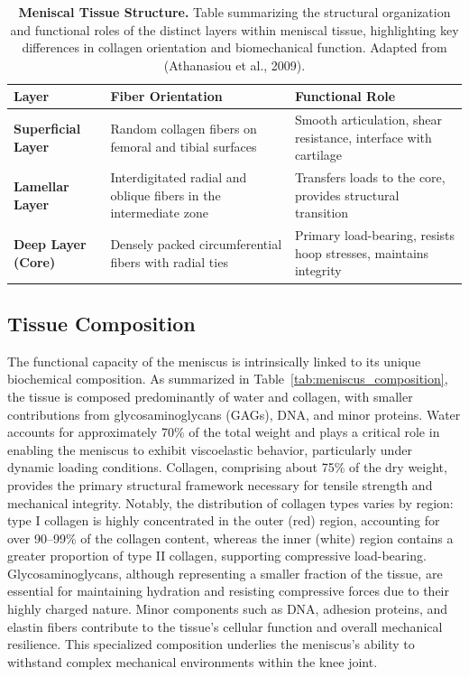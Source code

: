 \begin{table}[H]
    \centering
    \renewcommand{\arraystretch}{1.}
    \setlength{\tabcolsep}{8pt}
    \begin{tabular}{|l|p{5cm}|p{5cm}|}
        \hline
        \rowcolor{blue!20}
        \textbf{Layer} & \textbf{Fiber Orientation}& \textbf{Functional Role} \\ \hline
        \textbf{Superficial Layer} & Random collagen fibers on femoral and tibial surfaces & Smooth articulation, shear resistance, interface with cartilage \\ \hline
        \textbf{Lamellar Layer} & Interdigitated radial and oblique fibers in the intermediate zone & Transfers loads to the core, provides structural transition \\ \hline
        \textbf{Deep Layer (Core)} & Densely packed circumferential fibers with radial ties & Primary load-bearing, resists hoop stresses, maintains integrity \\ \hline
    \end{tabular}
    \caption{\textbf{Meniscal Tissue Structure.} Table summarizing the structural organization and functional roles of the distinct layers within meniscal tissue, highlighting key differences in collagen orientation and biomechanical function. Adapted from (Athanasiou et al., 2009).}
    \label{tab:meniscal_structure}
\end{table}

\subsection{Tissue Composition}

The functional capacity of the meniscus is intrinsically linked to its unique biochemical composition. As summarized in Table~\ref{tab:meniscus_composition}, the tissue is composed predominantly of water and collagen, with smaller contributions from glycosaminoglycans (GAGs), DNA, and minor proteins. Water accounts for approximately 70\% of the total weight and plays a critical role in enabling the meniscus to exhibit viscoelastic behavior, particularly under dynamic loading conditions\cite{makris2011kneemeniscus,gupta2020meniscaltissue,moutos2007biomimeticthreedimensional}. Collagen, comprising about 75\% of the dry weight, provides the primary structural framework necessary for tensile strength and mechanical integrity. Notably, the distribution of collagen types varies by region: type I collagen is highly concentrated in the outer (red) region, accounting for over 90--99\% of the collagen content, whereas the inner (white) region contains a greater proportion of type II collagen, supporting compressive load-bearing\cite{athanasiou2009engineeringknee,bahcecioglu20193dprinted}. Glycosaminoglycans, although representing a smaller fraction of the tissue, are essential for maintaining hydration and resisting compressive forces due to their highly charged nature. Minor components such as DNA, adhesion proteins, and elastin fibers contribute to the tissue's cellular function and overall mechanical resilience. This specialized composition underlies the meniscus's ability to withstand complex mechanical environments within the knee joint\cite{vetri2019advancedmicroscopy}.

